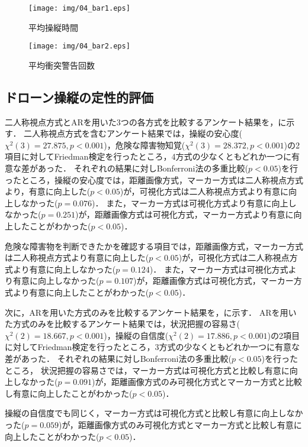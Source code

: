 \documentclass[submit, sigrecommended]{ipsj}
\begin{document}
  \begin{figure}[b]
    \centering
    \texttt{[image: img/04\_bar1.eps]}
    \caption{平均操縦時間}
    \label{fig:04_bar1}
    \end{figure}
    
    \begin{figure}[b]
    \centering
    \texttt{[image: img/04\_bar2.eps]}
    \caption{平均衝突警告回数}
    \label{fig:04_bar2}
    \end{figure}
    

\subsection{ドローン操縦の定性的評価}
\label{result_2}
二人称視点方式とARを用いた3つの各方式を比較するアンケート結果を，に示す．
二人称視点方式を含むアンケート結果では，操縦の安心度($\chi^{2}(3)=27.875, p < 0.001$)，危険な障害物知覚($\chi^{2}(3)=28.372, p < 0.001$)の2項目に対してFriedman検定を行ったところ，4方式の少なくともどれか一つに有意な差があった．
それぞれの結果に対しBonferroni法の多重比較($p < 0.05$)を行ったところ，操縦の安心度では，距離画像方式，マーカー方式は二人称視点方式より，有意に向上した($p < 0.05$)が，可視化方式は二人称視点方式より有意に向上しなかった($p = 0.076$)．
また，マーカー方式は可視化方式より有意に向上しなかった($p = 0.251$)が，距離画像方式は可視化方式，マーカー方式より有意に向上したことがわかった($p < 0.05$)．
\par
危険な障害物を判断できたかを確認する項目では，距離画像方式，マーカー方式は二人称視点方式より有意に向上した($p < 0.05$)が，可視化方式は二人称視点方式より有意に向上しなかった($p = 0.124$)．
また，マーカー方式は可視化方式より有意に向上しなかった($p = 0.107$)が，距離画像方式は可視化方式，マーカー方式より有意に向上したことがわかった($p < 0.05$)．
\par
次に，ARを用いた方式のみを比較するアンケート結果を，に示す．
ARを用いた方式のみを比較するアンケート結果では，状況把握の容易さ($\chi^{2}(2)=18.667, p < 0.001$)，操縦の自信度($\chi^{2}(2)=17.886, p < 0.001$)の2項目に対してFriedman検定を行ったところ，3方式の少なくともどれか一つに有意な差があった．
それぞれの結果に対しBonferroni法の多重比較($p < 0.05$)を行ったところ，
状況把握の容易さでは，マーカー方式は可視化方式と比較し有意に向上しなかった($p = 0.091$)が，距離画像方式のみ可視化方式とマーカー方式と比較し有意に向上したことがわかった($p < 0.05$)．
\par
操縦の自信度でも同じく，マーカー方式は可視化方式と比較し有意に向上しなかった($p = 0.059$)が，距離画像方式のみ可視化方式とマーカー方式と比較し有意に向上したことがわかった($p < 0.05$)．
\end{document}
